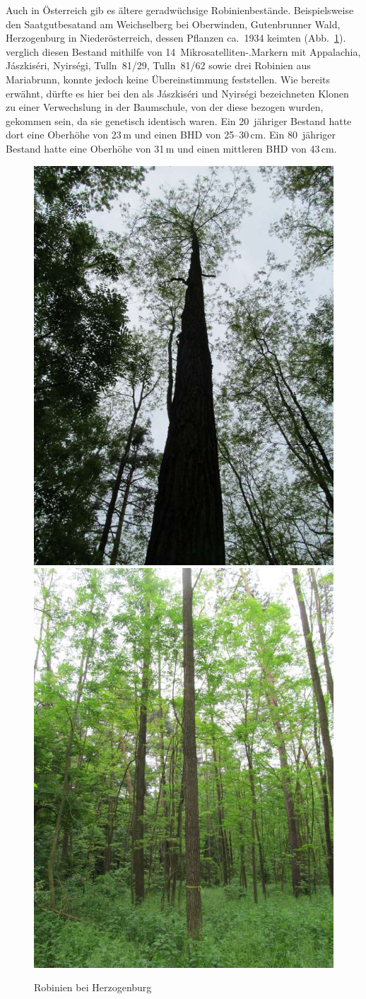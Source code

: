 \documentclass[twocolumn]{scrartcl}
\begin{document}
Auch in Österreich gib es ältere geradwüchsige Robinienbestände.
Beispielsweise den Saatgutbesatand am Weichselberg bei
Oberwinden, Gutenbrunner Wald, Herzogenburg in Niederösterreich,
dessen Pflanzen ca.\ 1934 keimten (Abb.~\ref{fig:hezogenburg}).
\cite{heinze2014robinie} verglich diesen Bestand mithilfe von 14~Mikrosatelliten-.Markern mit Appalachia, Jászkiséri, Nyirségi, Tulln~81/29, Tulln~81/62 sowie drei Robinien aus Mariabrunn, konnte jedoch keine Übereinstimmung feststellen.
Wie bereits erwähnt, dürfte es hier bei den als Jászkiséri und Nyirségi bezeichneten Klonen zu einer Verwechslung in der Baumschule, von der diese bezogen wurden, gekommen sein, da sie genetisch identisch waren.
Ein 20~jähriger Bestand hatte dort eine Oberhöhe von
23\,m und einen BHD von 25--30\,cm. Ein 80~jähriger Bestand hatte eine
Oberhöhe von 31\,m und einen mittleren BHD von 43\,cm.

\begin{figure}[htbp]
  \centering
  \includegraphics[width=.45\linewidth]{./bild/HerzogenburgRobinie2023a}
  \includegraphics[width=.45\linewidth]{./bild/HerzogenburgRobinie2023b}
  \caption{Robinien bei Herzogenburg}
  \label{fig:hezogenburg}
\end{figure}
\end{document}
